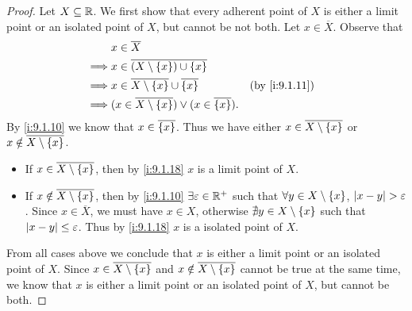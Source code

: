 \begin{proof}
  Let \(X \subseteq \mathbb{R}\).
  We first show that every adherent point of \(X\) is either a limit point or an isolated point of \(X\), but cannot be not both.
  Let \(x \in \overline{X}\).
  Observe that
  \begin{align*}
             & x \in \overline{X}                                                                         \\
    \implies & x \in \overline{(X \setminus \set{x}) \cup \set{x}}                                        \\
    \implies & x \in \overline{X \setminus \set{x}} \cup \overline{\set{x}}            &  & \by{i:9.1.11} \\
    \implies & (x \in \overline{X \setminus \set{x}}) \lor (x \in \overline{\set{x}}).
  \end{align*}
  By \cref{i:9.1.10} we know that \(x \in \overline{\left\lbrace x\right\rbrace}\).
  Thus we have either \(x \in \overline{X \setminus \left\lbrace x\right\rbrace}\) or \(x \notin \overline{X \setminus \left\lbrace x\right\rbrace}\).
  \begin{itemize}
    \item If \(x \in \overline{X \setminus \left\lbrace x\right\rbrace}\), then by \cref{i:9.1.18} \(x\) is a limit point of \(X\).
    \item If \(x \notin \overline{X \setminus \left\lbrace x\right\rbrace}\), then by \cref{i:9.1.10} \(\exists \varepsilon \in \mathbb{R}^+\) such that \(\forall y \in X \setminus \left\lbrace x\right\rbrace\), \(\left\lvert x - y\right\rvert > \varepsilon\).
          Since \(x \in \overline{X}\), we must have \(x \in X\), otherwise \(\nexists y \in X \setminus \left\lbrace x\right\rbrace\) such that \(\left\lvert x - y\right\rvert \leq \varepsilon\).
          Thus by \cref{i:9.1.18} \(x\) is a isolated point of \(X\).
  \end{itemize}
  From all cases above we conclude that \(x\) is either a limit point or an isolated point of \(X\).
  Since \(x \in \overline{X \setminus \left\lbrace x\right\rbrace}\) and \(x \notin \overline{X \setminus \left\lbrace x\right\rbrace}\) cannot be true at the same time, we know that \(x\) is either a limit point or an isolated point of \(X\), but cannot be both.


\end{proof}
